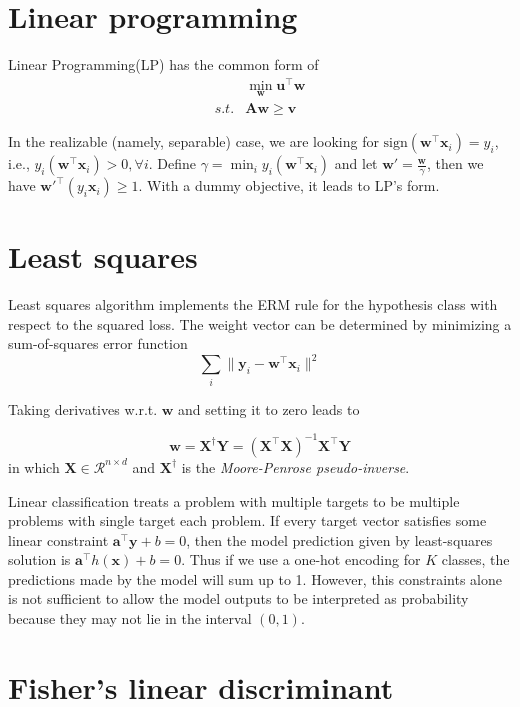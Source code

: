 \documentclass{article}
\begin{document}
\section{Linear programming}
	Linear Programming(LP) has the common form of
	\begin{equation*}
	\begin{split}
	&\min_\mathbf{w} \mathbf{u}^\top \mathbf{w} \\
	s.t. & \mathbf{Aw} \geq \mathbf{v}
	\end{split}
	\end{equation*}
	
	In the realizable (namely, separable) case, we are looking for $\text{sign}(\mathbf{w}^\top \mathbf{x}_i)=y_i$, i.e., $y_i(\mathbf{w}^\top \mathbf{x}_i)> 0, \forall i$. Define $\gamma=\min_i y_i(\mathbf{w}^\top \mathbf{x}_i)$ and let $\mathbf{w}'=\frac{\mathbf{w}}{\gamma}$, then we have $\mathbf{w}'^\top (y_i \mathbf{x}_i)\geq 1 $. With a dummy objective, it leads to LP's form.
	
\section{Least squares} 
	 
	 Least squares algorithm implements the ERM rule for the hypothesis class with respect to the squared loss. The weight vector can be determined by minimizing a sum-of-squares error function 
	$$\sum_i \|\mathbf{y}_i- \mathbf{w}^\top \mathbf{x}_i\|^2$$
	
Taking derivatives w.r.t. $\mathbf{w}$ and setting it to zero leads to

	$$\mathbf{w} = \mathbf{X}^\dagger \mathbf{Y} = (\mathbf{X}^\top \mathbf{X})^{-1} \mathbf{X}^\top \mathbf{Y}$$
in which $\mathbf{X}\in \mathcal{R}^{n\times d}$ and $\mathbf{X}^\dagger$ is the  \textit{Moore-Penrose pseudo-inverse}.
	
	Linear classification treats a problem with multiple targets to be multiple problems with single target each problem. If every target vector satisfies some  linear constraint $\mathbf{a}^\top \mathbf{y} + b = 0$, then the model prediction given by least-squares solution is $\mathbf{a}^\top h(\mathbf{x}) + b = 0$. Thus if we use a one-hot encoding for $K$ classes, the predictions made by the model will sum up to 1. However, this constraints alone is not sufficient to allow the model outputs to be interpreted as probability because they may not lie in the interval $(0,1)$.

\section{Fisher's linear discriminant}
	
\end{document}
